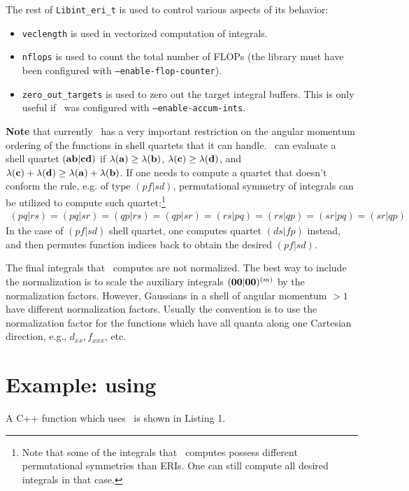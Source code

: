 \documentclass[12pt]{article}
\begin{document}
The rest of {\tt Libint\_eri\_t} is used to control various aspects of its behavior:
\begin{itemize}
\item {\tt veclength} is used in vectorized computation of integrals.
\item {\tt nflops} is used to count the total number of FLOPs (the library must have been configured
  with {\tt --enable-flop-counter}).
\item {\tt zero\_out\_targets} is used to zero out the target integral buffers. This is only useful
  if \LIBINT\ was configured with {\tt --enable-accum-ints}.
\end{itemize}

{\bf Note} that currently \LIBINT\ has a very important restriction on the angular momentum ordering of the functions
in shell quartets that it can handle. \LIBINT\ can evaluate a shell quartet
$({\bf ab}|{\bf cd})$ if $\lambda({\bf a}) \geq \lambda({\bf b})$,
$\lambda({\bf c}) \geq \lambda({\bf d})$, and $\lambda({\bf c}) + \lambda({\bf d}) \geq \lambda({\bf a}) + \lambda({\bf b})$.
If one needs to compute a quartet that doesn't conform the rule, e.g. of type $(pf|sd)$,
permutational symmetry of integrals can be utilized to compute such quartet:\footnote{Note that some
of the integrals that \librij\ computes possess different permutational symmetries than ERIs. One can still
compute all desired integrals in that case.}
\begin{eqnarray}
(pq|rs) = (pq|sr) = (qp|rs) = (qp|sr) = (rs|pq) = (rs|qp)= (sr|pq) = (sr|qp)
\end{eqnarray}
In the case of $(pf|sd)$ shell quartet, one computes quartet $(ds|fp)$ instead, and then
permutes function indices back to obtain the desired $(pf|sd)$.

The final integrals that \LIBINT\ computes are not normalized. The best way to include the normalization
is to scale the auxiliary integrals $({\bf 00}|{\bf 00})^{(m)}$ by the normalization factors.
However, Gaussians in a shell of angular momentum $>1$ have different normalization factors.
Usually the convention is to use the normalization factor for the functions which have all quanta along
one Cartesian direction, e.g., $d_{xx}, f_{xxx}$, etc.

\section{Example: using \libint}

A C++ function which uses \LIBINT\ is shown in Listing 1.
\end{document}
